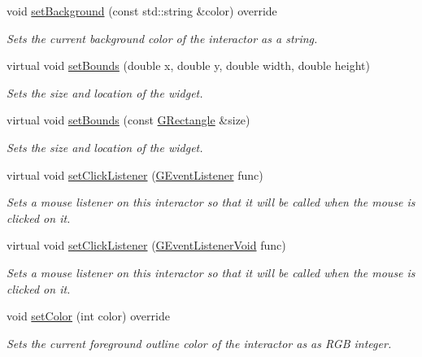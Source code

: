 \begin{DoxyCompactItemize}
void \mbox{\hyperlink{classsgl_1_1GCanvas_a9cb99695b93494c7ba28268ce9e42c2a}{set\+Background}} (const std\+::string \&color) override
\begin{DoxyCompactList}\small\item\em Sets the current background color of the interactor as a string. \end{DoxyCompactList}\item 
virtual void \mbox{\hyperlink{classsgl_1_1GInteractor_a2aae8197624b72265ab83b4f1bc73f2f}{set\+Bounds}} (double x, double y, double width, double height)
\begin{DoxyCompactList}\small\item\em Sets the size and location of the widget. \end{DoxyCompactList}\item 
virtual void \mbox{\hyperlink{classsgl_1_1GInteractor_acada386653f008cacc7cce86426bef7c}{set\+Bounds}} (const \mbox{\hyperlink{structsgl_1_1GRectangle}{G\+Rectangle}} \&size)
\begin{DoxyCompactList}\small\item\em Sets the size and location of the widget. \end{DoxyCompactList}\item 
virtual void \mbox{\hyperlink{classsgl_1_1GInteractor_abd40af6921242584d0954f173911b190}{set\+Click\+Listener}} (\mbox{\hyperlink{namespacesgl_ae9f3e9eab70035da1a2b114e21357b25}{G\+Event\+Listener}} func)
\begin{DoxyCompactList}\small\item\em Sets a mouse listener on this interactor so that it will be called when the mouse is clicked on it. \end{DoxyCompactList}\item 
virtual void \mbox{\hyperlink{classsgl_1_1GInteractor_a856414c92df90f56f3877475eb3f8fc4}{set\+Click\+Listener}} (\mbox{\hyperlink{namespacesgl_a54427ce97bb1c2804e4fe2b0a62e8b17}{G\+Event\+Listener\+Void}} func)
\begin{DoxyCompactList}\small\item\em Sets a mouse listener on this interactor so that it will be called when the mouse is clicked on it. \end{DoxyCompactList}\item 
void \mbox{\hyperlink{classsgl_1_1GCanvas_af6e1bcf23a09a0ae0607daff81ee45fa}{set\+Color}} (int color) override
\begin{DoxyCompactList}\small\item\em Sets the current foreground outline color of the interactor as as R\+GB integer. \end{DoxyCompactList}\item 

\end{DoxyCompactItemize}
